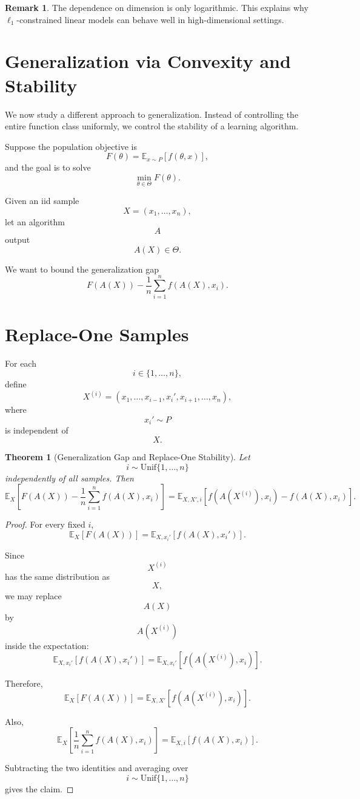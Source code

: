 \documentclass[12pt,oneside]{book}
\numberwithin{equation}{section}
\theoremstyle{definition}
\newtheorem{remark}{Remark}[section]
\theoremstyle{plain}
\newtheorem{theorem}{Theorem}[section]
\theoremstyle{remark}
\newcommand{\E}{\mathbb{E}}
\begin{document}
\begin{remark}
The dependence on dimension is only logarithmic. This explains why $\ell_1$-constrained linear models can behave well in high-dimensional settings.
\end{remark}

\section{Generalization via Convexity and Stability}

We now study a different approach to generalization. Instead of controlling the entire function class uniformly, we control the stability of a learning algorithm.

Suppose the population objective is
\[
F(\theta)
=
\E_{x\sim P}[f(\theta,x)],
\]
and the goal is to solve
\[
\min_{\theta\in\Theta}F(\theta).
\]

Given an iid sample
\[
X=(x_1,\dots,x_n),
\]
let an algorithm
\[
A
\]
output
\[
A(X)\in\Theta.
\]

We want to bound the generalization gap
\[
F(A(X))
-
\frac{1}{n}\sum_{i=1}^n f(A(X),x_i).
\]

\section{Replace-One Samples}

For each
\[
i\in\{1,\dots,n\},
\]
define
\[
X^{(i)}
=
(x_1,\dots,x_{i-1},x_i',x_{i+1},\dots,x_n),
\]
where
\[
x_i'\sim P
\]
is independent of
\[
X.
\]

\begin{theorem}[Generalization Gap and Replace-One Stability]
Let
\[
i\sim \mathrm{Unif}\{1,\dots,n\}
\]
independently of all samples. Then
\[
\E_X
\left[
F(A(X))
-
\frac{1}{n}
\sum_{i=1}^n
f(A(X),x_i)
\right]
=
\E_{X,X',i}
\left[
f(A(X^{(i)}),x_i)
-
f(A(X),x_i)
\right].
\]
\end{theorem}

\begin{proof}
For every fixed $i$,
\[
\E_X[F(A(X))]
=
\E_{X,x_i'}[f(A(X),x_i')].
\]

Since
\[
X^{(i)}
\]
has the same distribution as
\[
X,
\]
we may replace
\[
A(X)
\]
by
\[
A(X^{(i)})
\]
inside the expectation:
\[
\E_{X,x_i'}[f(A(X),x_i')]
=
\E_{X,x_i'}[f(A(X^{(i)}),x_i)].
\]

Therefore,
\[
\E_X[F(A(X))]
=
\E_{X,X'}[f(A(X^{(i)}),x_i)].
\]

Also,
\[
\E_X
\left[
\frac{1}{n}
\sum_{i=1}^n f(A(X),x_i)
\right]
=
\E_{X,i}[f(A(X),x_i)].
\]

Subtracting the two identities and averaging over
\[
i\sim \mathrm{Unif}\{1,\dots,n\}
\]
gives the claim.
\end{proof}
\end{document}
